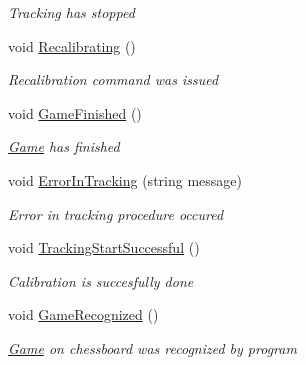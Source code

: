 \begin{DoxyCompactItemize}
\begin{DoxyCompactList}\small\item\em Tracking has stopped \end{DoxyCompactList}\item 
void \mbox{\hyperlink{class_chess_tracking_1_1_controlling_elements_1_1_program_state_1_1_program_state_controller_ae815016db915cdbf14a9705560038f19}{Recalibrating}} ()
\begin{DoxyCompactList}\small\item\em Recalibration command was issued \end{DoxyCompactList}\item 
void \mbox{\hyperlink{class_chess_tracking_1_1_controlling_elements_1_1_program_state_1_1_program_state_controller_a20a84c94188c6e15e464152862d13647}{Game\+Finished}} ()
\begin{DoxyCompactList}\small\item\em \mbox{\hyperlink{namespace_chess_tracking_1_1_game}{Game}} has finished \end{DoxyCompactList}\item 
void \mbox{\hyperlink{class_chess_tracking_1_1_controlling_elements_1_1_program_state_1_1_program_state_controller_adff6e8fc8dff0a594286ae35b59d416c}{Error\+In\+Tracking}} (string message)
\begin{DoxyCompactList}\small\item\em Error in tracking procedure occured \end{DoxyCompactList}\item 
void \mbox{\hyperlink{class_chess_tracking_1_1_controlling_elements_1_1_program_state_1_1_program_state_controller_a029929ed04eab54893eaed751f7bcae2}{Tracking\+Start\+Successful}} ()
\begin{DoxyCompactList}\small\item\em Calibration is succesfully done \end{DoxyCompactList}\item 
void \mbox{\hyperlink{class_chess_tracking_1_1_controlling_elements_1_1_program_state_1_1_program_state_controller_af3085a452edced63dca39e16da3459c7}{Game\+Recognized}} ()
\begin{DoxyCompactList}\small\item\em \mbox{\hyperlink{namespace_chess_tracking_1_1_game}{Game}} on chessboard was recognized by program \end{DoxyCompactList}\end{DoxyCompactItemize}
